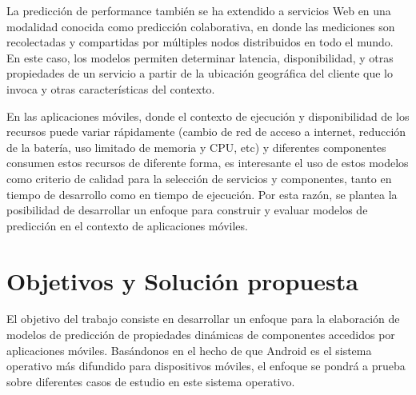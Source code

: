 La predicción de performance también se ha extendido a servicios Web
\cite{Zheng2013} en una modalidad conocida como predicción colaborativa,
en donde las mediciones son recolectadas y compartidas por múltiples
nodos distribuidos en todo el mundo. En este caso, los modelos permiten
determinar latencia, disponibilidad, y otras propiedades de un servicio
a partir de la ubicación geográfica del cliente que lo invoca y otras
características del contexto. 

En las aplicaciones móviles, donde el contexto de ejecución y disponibilidad
de los recursos puede variar rápidamente (cambio de red de acceso
a internet, reducción de la batería, uso limitado de memoria y \ac{CPU},
etc) y diferentes componentes consumen estos recursos de diferente
forma, es interesante el uso de estos modelos como criterio de calidad
para la selección de servicios y componentes, tanto en tiempo de desarrollo
como en tiempo de ejecución. Por esta razón, se plantea la posibilidad
de desarrollar un enfoque para construir y evaluar modelos de predicción
en el contexto de aplicaciones móviles. 


\section{Objetivos y Solución propuesta\label{sec:Objetivos-Soluci=0000F3n-propuesta}}

El objetivo del trabajo consiste en desarrollar un enfoque para la
elaboración de modelos de predicción de propiedades dinámicas de componentes
accedidos por aplicaciones móviles. Basándonos en el hecho de que
Android es el sistema operativo más difundido para dispositivos móviles,
el enfoque se pondrá a prueba sobre diferentes casos de estudio en
este sistema operativo. 

